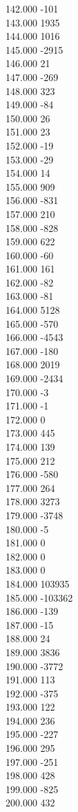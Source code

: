 { 142.000	-101 \\
 143.000	1935 \\
 144.000	1016 \\
 145.000	-2915 \\
 146.000	21 \\
 147.000	-269 \\
 148.000	323 \\
 149.000	-84 \\
 150.000	26 \\
 151.000	23 \\
 152.000	-19 \\
 153.000	-29 \\
 154.000	14 \\
 155.000	909 \\
 156.000	-831 \\
 157.000	210 \\
 158.000	-828 \\
 159.000	622 \\
 160.000	-60 \\
 161.000	161 \\
 162.000	-82 \\
 163.000	-81 \\
 164.000	5128 \\
 165.000	-570 \\
 166.000	-4543 \\
 167.000	-180 \\
 168.000	2019 \\
 169.000	-2434 \\
 170.000	-3 \\
 171.000	-1 \\
 172.000	0 \\
 173.000	445 \\
 174.000	139 \\
 175.000	212 \\
 176.000	-580 \\
 177.000	264 \\
 178.000	3273 \\
 179.000	-3748 \\
 180.000	-5 \\
 181.000	0 \\
 182.000	0 \\
 183.000	0 \\
 184.000	103935 \\
 185.000	-103362 \\
 186.000	-139 \\
 187.000	-15 \\
 188.000	24 \\
 189.000	3836 \\
 190.000	-3772 \\
 191.000	113 \\
 192.000	-375 \\
 193.000	122 \\
 194.000	236 \\
 195.000	-227 \\
 196.000	295 \\
 197.000	-251 \\
 198.000	428 \\
 199.000	-825 \\
 200.000	432 \\
}
